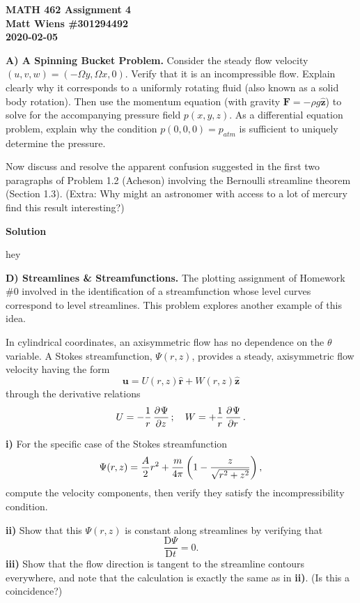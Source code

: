 \documentclass{article}
\def\*#1{\mathbf{#1}}
\newcommand{\dadvd}[2]{\dfrac{\text{D} #1}{\text{D} #2}} %
\newcommand{\rhat}{\mathbf{\hat{r}}}
\newcommand{\zhat}{\mathbf{\hat{z}}}
\begin{document}
\textbf{MATH 462 Assignment 4} \\
\textbf{Matt Wiens \#301294492} \\
\textbf{2020-02-05}

\textbf{A) A Spinning Bucket Problem.}
Consider the steady flow velocity $(u, v, w) = (-\Omega y, \Omega x,
0)$. Verify that it is an incompressible flow. Explain clearly why it
corresponds to a uniformly rotating fluid (also known as a solid body
rotation). Then use the momentum equation (with gravity $\*F = - \rho g
\zhat$) to solve for the accompanying pressure field $p(x, y, z)$. As a
differential equation problem, explain why the condition $p(0, 0,
0) = p_{atm}$ is sufficient to uniquely determine the pressure.

Now discuss and resolve the apparent confusion suggested in the first
two paragraphs of Problem 1.2 (Acheson) involving the Bernoulli
streamline theorem (Section 1.3). (Extra: Why might an astronomer with
access to a lot of mercury find this result interesting?)

\textbf{Solution}

hey

\newpage

\textbf{D) Streamlines \& Streamfunctions.}
The plotting assignment of Homework \#0 involved in the identification
of a streamfunction whose level curves correspond to level streamlines.
This problem explores another example of this idea.

In cylindrical coordinates, an axisymmetric flow has no dependence on
the $\theta$ variable. A Stokes streamfunction, $\Psi(r, z)$, provides a
steady, axisymmetric flow velocity having the form
%
\begin{equation*}
    \*u = U(r, z) \rhat + W(r, z) \zhat
\end{equation*}
%
through the derivative relations
%
\begin{equation*}
    U = - \frac{1}{r} \dpd{\Psi}{z}; \quad W = + \frac{1}{r} \dpd{\Psi}{r}
    .
\end{equation*}

\textbf{i)} For the specific case of the Stokes streamfunction
%
\begin{equation*}
    \Psi(r, z) = \frac{A}{2} r^2 + \frac{m}{4 \pi} \del{1 - \frac{z}{\sqrt{r^2 + z^2}}}
    ,
\end{equation*}
%
compute the velocity components, then verify they satisfy the
incompressibility condition.

\textbf{ii)} Show that this $\Psi(r, z)$ is constant along streamlines
by verifying that
%
\begin{equation*}
    \dadvd{\Psi}{t} = 0
    .
\end{equation*}
%
\textbf{iii)} Show that the flow direction is tangent to the streamline
contours everywhere, and note that the calculation is exactly the same
as in \textbf{ii)}. (Is this a coincidence?)
\end{document}
